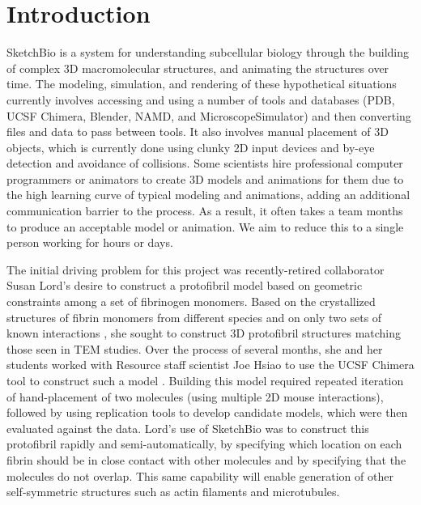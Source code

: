 \documentclass{article} %
\begin{document}
\section{Introduction}
SketchBio is a system for understanding subcellular biology through the building of complex 3D macromolecular structures, and animating the structures over time.   The modeling, simulation, and rendering of these hypothetical situations currently involves accessing and using a number of tools and databases (PDB, UCSF Chimera, Blender, NAMD, and MicroscopeSimulator) and then converting files and data to pass between tools.  It also involves manual placement of 3D objects, which is currently done using clunky 2D input devices and by-eye detection and avoidance of collisions.  Some scientists hire professional computer programmers or animators to create 3D models and animations for them due to the high learning curve of typical modeling and animations, adding an additional communication barrier to the process.  As a result, it often takes a team months to produce an acceptable model or animation.  We aim to reduce this to a single person working for hours or days.

The initial driving problem for this project was recently-retired collaborator Susan Lord's desire to construct a protofibril model based on geometric constraints among a set of fibrinogen monomers.  Based on the crystallized structures of fibrin monomers from different species and on only two sets of known interactions \cite{lord2007fibrinogen}, she sought to construct 3D protofibril structures matching those seen in TEM studies.  Over the process of several months, she and her students worked with Resource staff scientist Joe Hsiao to use the UCSF Chimera\cite{pettersen2004ucsf} tool to construct such a model \cite{lordSubmitted}.  Building this model required repeated iteration of hand-placement of two molecules (using multiple 2D mouse interactions), followed by using replication tools to develop candidate models, which were then evaluated against the data.  Lord's use of SketchBio was to construct this protofibril rapidly and semi-automatically, by specifying which location on each fibrin should be in close contact with other molecules and by specifying that the molecules do not overlap.  This same capability will enable generation of other self-symmetric structures such as actin filaments and microtubules.
\end{document}

